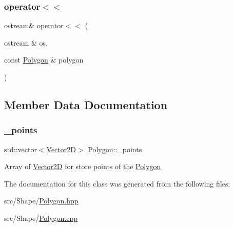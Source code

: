 \subsubsection{\texorpdfstring{operator$<$$<$}{operator<<}}
{\footnotesize\ttfamily ostream\& operator$<$$<$ (\begin{DoxyParamCaption}\item[{ostream \&}]{os,  }\item[{const \hyperlink{class_polygon}{Polygon} \&}]{polygon }\end{DoxyParamCaption})\hspace{0.3cm}{\ttfamily [friend]}}



\subsection{Member Data Documentation}
\hypertarget{class_polygon_a36bc7384f59aac1a731f1701af587916}{}\label{class_polygon_a36bc7384f59aac1a731f1701af587916} 
\subsubsection{\texorpdfstring{\+\_\+points}{\_points}}
{\footnotesize\ttfamily std\+::vector$<$\hyperlink{class_vector2_d}{Vector2D}$>$ Polygon\+::\+\_\+points\hspace{0.3cm}{\ttfamily [protected]}}

Array of \hyperlink{class_vector2_d}{Vector2D} for store points of the \hyperlink{class_polygon}{Polygon} 

The documentation for this class was generated from the following files\+:\begin{DoxyCompactItemize}
\item 
src/\+Shape/\hyperlink{_polygon_8hpp}{Polygon.\+hpp}\item 
src/\+Shape/\hyperlink{_polygon_8cpp}{Polygon.\+cpp}\end{DoxyCompactItemize}
